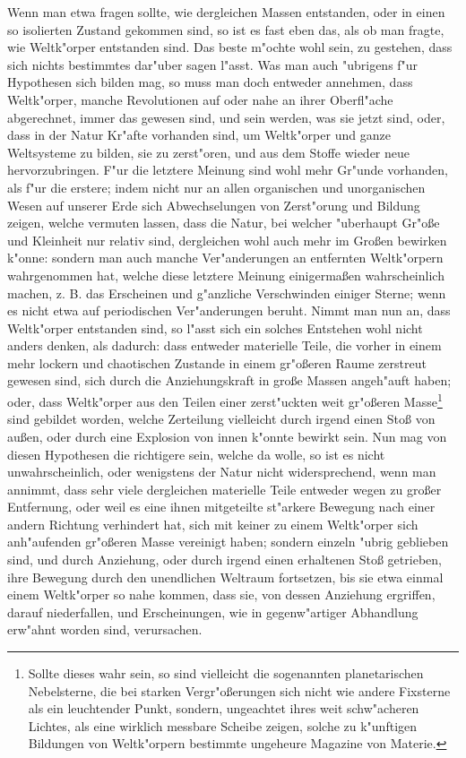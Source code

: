 \documentclass[a4paper, 11pt, oneside, polutonikogreek, german]{article}
\begin{document}
Wenn man etwa fragen sollte, wie dergleichen Massen entstanden, oder in einen so isolierten Zustand gekommen sind, so ist es fast eben das, als ob man fragte, wie Weltk"orper entstanden sind. Das beste m"ochte wohl sein, zu gestehen, dass sich nichts bestimmtes dar"uber sagen l"asst. Was man auch "ubrigens f"ur Hypothesen sich bilden mag, so muss man doch entweder annehmen, dass Weltk"orper, manche Revolutionen auf oder nahe an ihrer Oberfl"ache abgerechnet, immer das gewesen sind, und sein werden, was sie jetzt sind, oder, dass in der Natur Kr"afte vorhanden sind, um Weltk"orper und ganze Weltsysteme zu bilden, sie zu zerst"oren, und aus dem Stoffe wieder neue hervorzubringen. F"ur die letztere Meinung sind wohl mehr Gr"unde vorhanden, als f"ur die erstere; indem nicht nur an allen organischen und unorganischen Wesen auf unserer Erde sich Abwechselungen von Zerst"orung und Bildung zeigen, welche vermuten lassen, dass die Natur, bei welcher "uberhaupt Gr"oße und Kleinheit nur relativ sind, dergleichen wohl auch mehr im Großen bewirken k"onne: sondern man auch manche Ver"anderungen an entfernten Weltk"orpern wahrgenommen hat, welche diese letztere Meinung einigermaßen wahrscheinlich machen, z. B. das Erscheinen und g"anzliche Verschwinden einiger Sterne; wenn es nicht etwa auf periodischen Ver"anderungen beruht. Nimmt man nun an, dass Weltk"orper entstanden sind, so l"asst sich ein solches Entstehen wohl nicht anders denken, als dadurch: dass entweder materielle Teile, die vorher in einem mehr lockern und chaotischen Zustande in einem gr"oßeren Raume zerstreut gewesen sind, sich durch die Anziehungskraft in große Massen angeh"auft haben; oder, dass Weltk"orper aus den Teilen einer zerst"uckten weit gr"oßeren Masse\footnote{Sollte dieses wahr sein, so sind vielleicht die sogenannten planetarischen Nebelsterne, die bei starken Vergr"oßerungen sich nicht wie andere Fixsterne als ein leuchtender Punkt, sondern, ungeachtet ihres weit schw"acheren Lichtes, als eine wirklich messbare Scheibe zeigen, solche zu k"unftigen Bildungen von Weltk"orpern bestimmte ungeheure Magazine von Materie.} sind gebildet worden, welche Zerteilung vielleicht durch irgend einen Stoß von außen, oder durch eine Explosion von innen k"onnte bewirkt sein. Nun mag von diesen Hypothesen die richtigere sein, welche da wolle, so ist es nicht unwahrscheinlich, oder wenigstens der Natur nicht widersprechend, wenn man annimmt, dass sehr viele dergleichen materielle Teile entweder wegen zu großer Entfernung, oder weil es eine ihnen mitgeteilte st"arkere Bewegung nach einer andern Richtung verhindert hat, sich mit keiner zu einem Weltk"orper sich anh"aufenden gr"oßeren Masse vereinigt haben; sondern einzeln "ubrig geblieben sind, und durch Anziehung, oder durch irgend einen erhaltenen Stoß getrieben, ihre Bewegung durch den unendlichen Weltraum fortsetzen, bis sie etwa einmal einem Weltk"orper so nahe kommen, dass sie, von dessen Anziehung ergriffen, darauf niederfallen, und Erscheinungen, wie in gegenw"artiger Abhandlung erw"ahnt worden sind, verursachen.
\end{document}
